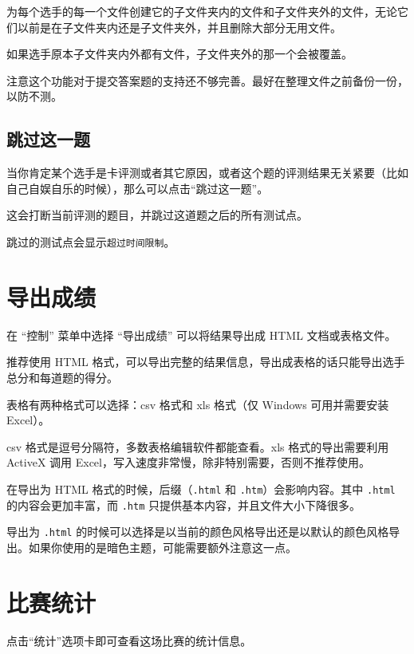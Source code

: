 \documentclass[UTF-8]{ctexart}
\begin{document}
			为每个选手的每一个文件创建它的子文件夹内的文件和子文件夹外的文件，无论它们以前是在子文件夹内还是子文件夹外，并且删除大部分无用文件。
			
			如果选手原本子文件夹内外都有文件，子文件夹外的那一个会被覆盖。
			
			注意这个功能对于提交答案题的支持还不够完善。最好在整理文件之前备份一份，以防不测。
		
		\subsection{跳过这一题}
		
			当你肯定某个选手是卡评测或者其它原因，或者这个题的评测结果无关紧要（比如自己自娱自乐的时候），那么可以点击“跳过这一题”。
			
			这会打断当前评测的题目，并跳过这道题之后的所有测试点。
			
			跳过的测试点会显示\texttt{超过时间限制}。
			
	\newpage
		
	\section{导出成绩}
	
		在 “控制” 菜单中选择 “导出成绩” 可以将结果导出成 HTML 文档或表格文件。
		
		推荐使用 HTML 格式，可以导出完整的结果信息，导出成表格的话只能导出选手总分和每道题的得分。
		
		表格有两种格式可以选择：csv 格式和 xls 格式（仅 Windows 可用并需要安装 Excel）。
		
		csv 格式是逗号分隔符，多数表格编辑软件都能查看。xls 格式的导出需要利用 ActiveX 调用 Excel，写入速度非常慢，除非特别需要，否则不推荐使用。
		
		在导出为 HTML 格式的时候，后缀（\texttt{.html} 和 \texttt{.htm}）会影响内容。其中 \texttt{.html} 的内容会更加丰富，而 \texttt{.htm} 只提供基本内容，并且文件大小下降很多。
		
		导出为 \texttt{.html} 的时候可以选择是以当前的颜色风格导出还是以默认的颜色风格导出。如果你使用的是暗色主题，可能需要额外注意这一点。
		
	\newpage
	
	\section{比赛统计}
	
		点击“统计”选项卡即可查看这场比赛的统计信息。
		
\end{document}
